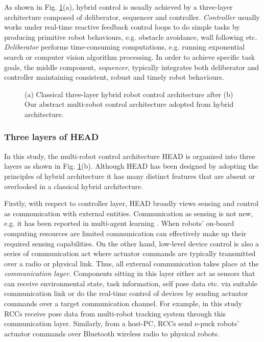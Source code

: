 As shown in Fig. \ref{fig:3-layer-arch}(a), hybrid control is usually achieved by a three-layer architecture composed of deliberator, sequencer and controller. {\em Controller} usually works under real-time reactive feedback control loops to do simple tasks by producing primitive robot behaviours, e.g. obstacle avoidance, wall following etc. {\em Deliberator} performs time-consuming computations, e.g. running exponential search or computer vision algorithm processing. In order to achieve specific task goals, the middle component, {\em sequencer}, typically integrates both deliberator and controller maintaining consistent, robust and timely robot behaviours.
\begin{figure}
\centering
{} 
\hspace{0.25cm}
\caption{(a) Classical three-layer hybrid robot control architecture after \protect{} 
(b) Our abstract multi-robot control architecture adopted from hybrid architecture.}
\label{fig:3-layer-arch}
\end{figure}
\subsubsection*{Three layers of HEAD}
In this study, the multi-robot control architecture HEAD is organized into three layers as shown in Fig. \ref{fig:3-layer-arch}(b). Although HEAD has been designed by adopting the principles of hybrid architecture it has many distinct features that are absent or overlooked in a classical hybrid architecture. 

Firstly, with respect to controller layer, HEAD broadly views sensing and control as communication with external entities. Communication as sensing is not new, e.g. it has been reported in multi-agent learning \cite{Mataric1998}. When robots' on-board computing resources are limited communication can effectively make up their required sensing capabilities. On the other hand, low-level device control is also a series of communication act where actuator commands are typically transmitted over a radio or physical link. Thus, all external communication takes place at the {\em communication layer}. Components sitting in this layer either act as sensors that can receive environmental state, task information, self pose data etc. via suitable communication link or do the real-time control of devices by sending actuator commands over a target communication channel. For example, in this study RCCs receive pose data from multi-robot tracking system through this communication layer.  Similarly, from a host-PC, RCCs send e-puck robots' actuator commands over Bluetooth wireless radio to physical robots.

